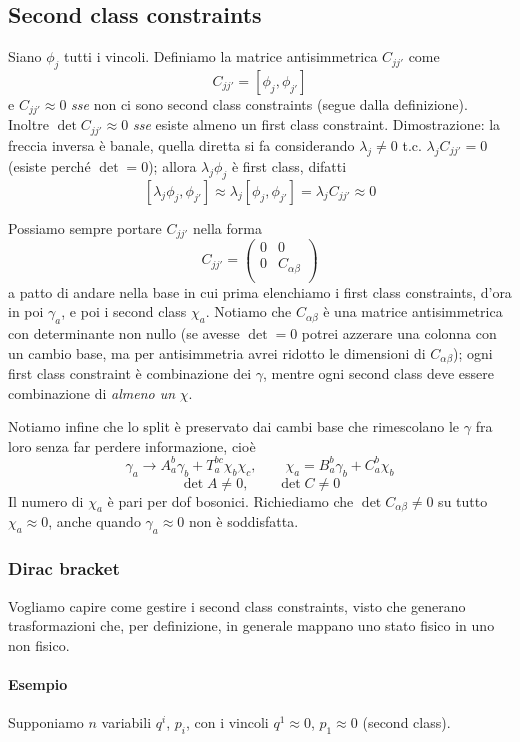 \documentclass[a4paper, 11pt]{article}
\begin{document}
	\subsection{Second class constraints}
	Siano $\phi_j$ tutti i vincoli. Definiamo la matrice antisimmetrica $C_{jj'}$ come
	\[ C_{jj'} = [\phi_j, \phi_{j'}] \]
	e $C_{jj'} \approx 0$ \emph{sse} non ci sono second class constraints (segue dalla definizione). Inoltre $\det C_{jj'} \approx 0$ \emph{sse} esiste almeno un first class constraint. Dimostrazione: la freccia inversa è banale, quella diretta si fa considerando $\lambda_j\neq 0$ t.c. $\lambda_j C_{jj'} = 0$ (esiste perché $\det=0$); allora $\lambda_j \phi_j$ è first class, difatti
	\[ [\lambda_j \phi_j, \phi_{j'}] \approx \lambda_j [\phi_j, \phi_{j'}] = \lambda_j C_{jj'} \approx 0 \]
	
	Possiamo sempre portare $C_{jj'}$ nella forma
	\[ C_{jj'} = \begin{pmatrix}
	0 & 0 \\
	0 & C_{\alpha\beta} \\
	\end{pmatrix} \]
	a patto di andare nella base in cui prima elenchiamo i first class constraints, d'ora in poi $\gamma_a$, e poi i second class $\chi_a$.
	Notiamo che $C_{\alpha\beta}$ è una matrice antisimmetrica con determinante non nullo (se avesse $\det=0$ potrei azzerare una colonna con un cambio base, ma per antisimmetria avrei ridotto le dimensioni di $C_{\alpha\beta}$); ogni first class constraint è combinazione dei $\gamma$, mentre ogni second class deve essere combinazione di \emph{almeno un} $\chi$.
	
	Notiamo infine che lo split è preservato dai cambi base che rimescolano le $\gamma$ fra loro senza far perdere informazione, cioè
	\[ \gamma_a \rightarrow A_a^b \gamma_b + T^{bc}_a \chi_b\chi_c,\qquad \chi_a = B_a^b \gamma_b + C_a^b \chi_b \]
	\[ \det A \neq 0,\qquad \det C \neq 0 \]
	Il numero di $\chi_a$ è pari per dof bosonici. Richiediamo che $\det C_{\alpha\beta} \neq 0$ su tutto $\chi_a\approx 0$, anche quando $\gamma_a \approx 0$ non è soddisfatta.
	
	\subsubsection{Dirac bracket}
	Vogliamo capire come gestire i second class constraints, visto che generano trasformazioni che, per definizione, in generale mappano uno stato fisico in uno non fisico.
	\paragraph{Esempio}
	Supponiamo $n$ variabili $q^i$, $p_i$, con i vincoli $q^1 \approx 0$, $p_1 \approx 0$ (second class).
	
\end{document}
